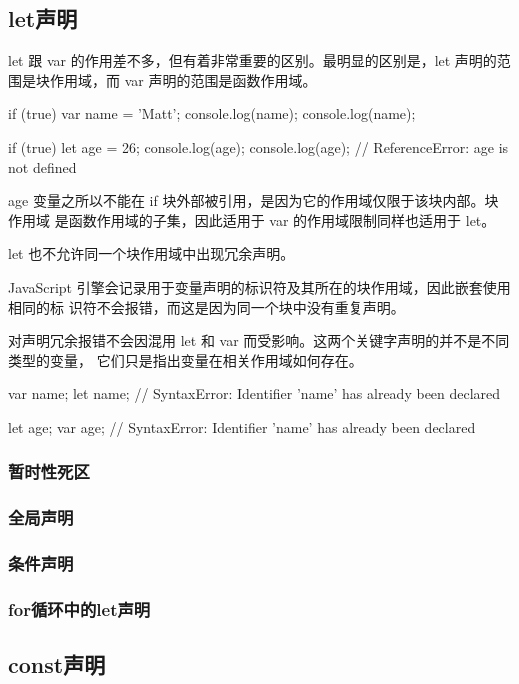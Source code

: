 \subsection{let声明}
let 跟 var 的作用差不多，但有着非常重要的区别。最明显的区别是，let 声明的范围是块作用域，而 var 声明的范围是函数作用域。
\begin{js}
    if (true) {
            var name = 'Matt';
            console.log(name);
        }
    console.log(name);

    if (true) {
            let age = 26;
            console.log(age);
        }
    console.log(age); // ReferenceError: age is not defined
\end{js}

age 变量之所以不能在 if 块外部被引用，是因为它的作用域仅限于该块内部。块作用域
是函数作用域的子集，因此适用于 var 的作用域限制同样也适用于 let。

let 也不允许同一个块作用域中出现冗余声明。

JavaScript 引擎会记录用于变量声明的标识符及其所在的块作用域，因此嵌套使用相同的标
识符不会报错，而这是因为同一个块中没有重复声明。

对声明冗余报错不会因混用 let 和 var 而受影响。这两个关键字声明的并不是不同类型的变量，
它们只是指出变量在相关作用域如何存在。
\begin{js}
    var name;
    let name; // SyntaxError: Identifier 'name' has already been declared

    let age;
    var age; // SyntaxError: Identifier 'name' has already been declared
\end{js}

\subsubsection{暂时性死区}
\subsubsection{全局声明}
\subsubsection{条件声明}
\subsubsection{for循环中的let声明}
\subsection{const声明}

